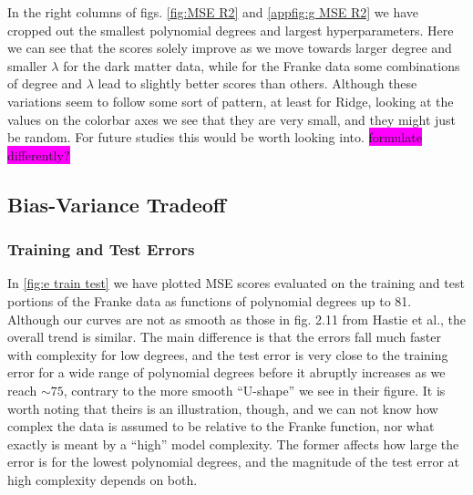 \documentclass[aps,pra,english,notitlepage,reprint,nofootinbib]{revtex4-1}  %
\begin{document}
In the right columns of figs. \ref{fig:MSE R2} and \ref{appfig:g MSE R2} we have cropped out the smallest polynomial degrees and largest hyperparameters. Here we can see that the scores solely improve as we move towards larger degree and smaller $\lambda$ for the dark matter data, while for the Franke data some combinations of degree and $\lambda$ lead to slightly better scores than others. Although these variations seem to follow some sort of pattern, at least for Ridge, looking at the values on the colorbar axes we see that they are very small, and they might just be random. For future studies this would be worth looking into. \colorbox{magenta}{formulate differently?}


\subsection{Bias-Variance Tradeoff}
\subsubsection{Training and Test Errors}
In \cref{fig:e train test} we have plotted MSE scores evaluated on the training and test portions of the Franke data as functions of polynomial degrees up to 81. Although our curves are not as smooth as those in fig. 2.11 from Hastie et al., the overall trend is similar. The main difference is that the errors fall much faster with complexity for low degrees, and the test error is very close to the training error for a wide range of polynomial degrees before it abruptly increases as we reach $\sim75$, contrary to the more smooth ``U-shape'' we see in their figure. It is worth noting that theirs is an illustration, though, and we can not know how complex the data is assumed to be relative to the Franke function, nor what exactly is meant by a ``high'' model complexity. The former affects how large the error is for the lowest polynomial degrees, and the magnitude of the test error at high complexity depends on both. 
\end{document}
